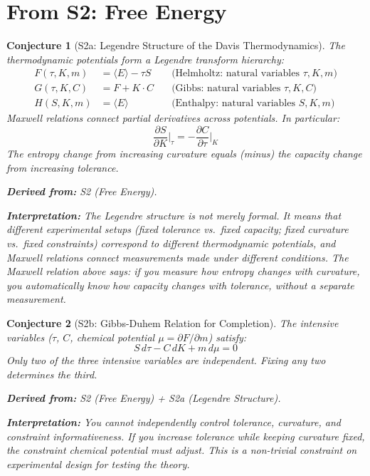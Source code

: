 \documentclass[11pt,letterpaper]{article}
\newtheorem{conjecture}{Conjecture}[section]
\begin{document}
\newpage
\section{From S2: Free Energy}

\begin{conjecture}[S2a: Legendre Structure of the Davis 
Thermodynamics]\label{conj:legendre}
The thermodynamic potentials form a Legendre transform hierarchy:
\begin{align}
    F(\tau, K, m) &= \langle E \rangle - \tau S 
    \quad &\text{(Helmholtz: natural variables } \tau, K, m\text{)} \\
    G(\tau, K, C) &= F + K \cdot C 
    \quad &\text{(Gibbs: natural variables } \tau, K, C\text{)} \\
    H(S, K, m) &= \langle E \rangle 
    \quad &\text{(Enthalpy: natural variables } S, K, m\text{)}
\end{align}
Maxwell relations connect partial derivatives across potentials. In 
particular:
\begin{equation}
    \frac{\partial S}{\partial K}\bigg|_{\tau} 
    = -\frac{\partial C}{\partial \tau}\bigg|_{K}
\end{equation}
The entropy change from increasing curvature equals (minus) the capacity 
change from increasing tolerance.

\textbf{Derived from:} S2 (Free Energy).

\textbf{Interpretation:} The Legendre structure is not merely formal. 
It means that different experimental setups (fixed tolerance vs.\ fixed 
capacity; fixed curvature vs.\ fixed constraints) correspond to different 
thermodynamic potentials, and Maxwell relations connect measurements made 
under different conditions. The Maxwell relation above says: if you 
measure how entropy changes with curvature, you automatically know how 
capacity changes with tolerance, without a separate measurement.
\end{conjecture}

\begin{conjecture}[S2b: Gibbs-Duhem Relation for 
Completion]\label{conj:gibbs_duhem}
The intensive variables ($\tau$, $C$, chemical potential $\mu = \partial F / 
\partial m$) satisfy:
\begin{equation}
    S \, d\tau - C \, dK + m \, d\mu = 0
\end{equation}
Only two of the three intensive variables are independent. Fixing any two 
determines the third.

\textbf{Derived from:} S2 (Free Energy) + S2a (Legendre Structure).

\textbf{Interpretation:} You cannot independently control tolerance, 
curvature, and constraint informativeness. If you increase tolerance while 
keeping curvature fixed, the constraint chemical potential must adjust. 
This is a non-trivial constraint on experimental design for testing the 
theory.
\end{conjecture}
\end{document}

